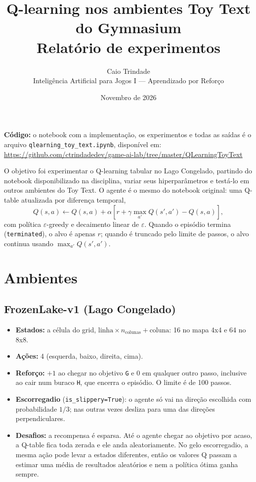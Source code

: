 \documentclass[11pt,a4paper]{article}
\title{\textbf{Q-learning nos ambientes Toy Text do Gymnasium}\\[0.3em]
  \large Relatório de experimentos}
\author{Caio Trindade\\
  \small Inteligência Artificial para Jogos I --- Aprendizado por Reforço}
\date{Novembro de 2026}
\begin{document}
\maketitle

\textbf{Código:} o notebook com a implementação, os experimentos e todas as saídas é o arquivo
\texttt{qlearning\_toy\_text.ipynb}, disponível em:\\
\url{https://github.com/ctrindadedev/game-ai-lab/tree/master/QLearningToyText}

O objetivo foi experimentar o Q-learning tabular no Lago Congelado, partindo do notebook disponibilizado na
disciplina, variar seus hiperparâmetros e testá-lo em outros ambientes do Toy Text. O agente é o mesmo do notebook
original: uma Q-table atualizada por diferença temporal,
\[
Q(s,a) \leftarrow Q(s,a) + \alpha\left[r + \gamma \max_{a'} Q(s',a') - Q(s,a)\right],
\]
com política $\varepsilon$-greedy e decaimento linear de $\varepsilon$. Quando o episódio termina (\texttt{terminated}),
o alvo é apenas $r$; quando é truncado pelo limite de passos, o alvo continua usando $\max_{a'} Q(s',a')$.

\section{Ambientes}

\subsection*{FrozenLake-v1 (Lago Congelado)}

\begin{itemize}
  \item \textbf{Estados:} a célula do grid, $\text{linha} \times n_{\text{colunas}} + \text{coluna}$: 16 no mapa 4x4
    e 64 no 8x8.
  \item \textbf{Ações:} 4 (esquerda, baixo, direita, cima).
  \item \textbf{Reforço:} $+1$ ao chegar no objetivo \texttt{G} e $0$ em qualquer outro passo, inclusive ao cair num
    buraco \texttt{H}, que encerra o episódio. O limite é de 100 passos.
  \item \textbf{Escorregadio} (\texttt{is\_slippery=True}): o agente só vai na direção escolhida com probabilidade
    $1/3$; nas outras vezes desliza para uma das direções perpendiculares.
  \item \textbf{Desafios:} a recompensa é esparsa. Até o agente chegar ao objetivo por acaso, a Q-table fica toda
    zerada e ele anda aleatoriamente. No gelo escorregadio, a mesma ação pode levar a estados diferentes, então os
    valores Q passam a estimar uma média de resultados aleatórios e nem a política ótima ganha sempre.
\end{itemize}
\end{document}
